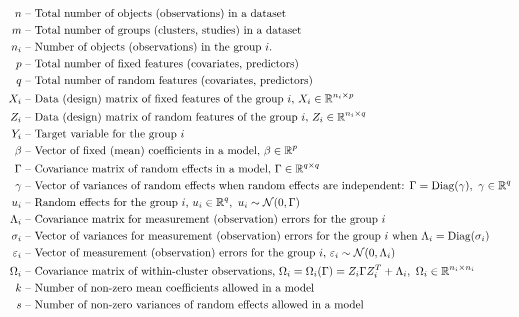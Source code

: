 \documentclass[11pt,letterpaper]{article}
\numberwithin{equation}{section} %
\numberwithin{figure}{section} %
\numberwithin{table}{section} %
\begin{document}
\begin{center}
	\begin{equation}
		\begin{split}
			n & \text{ -- Total number of objects (observations) in a dataset} \\
			m & \text{ -- Total number of groups (clusters, studies) in a dataset} \\
			n_i & \text{ -- Number of objects (observations) in the group } i. \\
			p & \text{ -- Total number of fixed features (covariates, predictors)} \\
			q & \text{ -- Total number of random features (covariates, predictors)} \\
			X_i & \text{ -- Data (design) matrix of fixed features of the group $i$, } X_i \in \R^{n_i \times p} \\
			Z_i & \text{ -- Data (design) matrix of random features of the group $i$, } Z_i \in \R^{n_i \times q} \\
			Y_i & \text{ -- Target variable for the group } i \\
			\beta & \text{ -- Vector of fixed (mean) coefficients in a model, } \beta \in \R^{p} \\
			\Gamma & \text{ -- Covariance matrix of random effects in a model, } \Gamma \in \R^{q\times q} \\
			\gamma & \text{ -- Vector of variances of random effects when random effects are independent: } \Gamma = \diag(\gamma), \ \gamma \in \R^{q} \\
			u_i & \text{ -- Random effects for the group $i$, } u_i \in \R^q, \ u_i \sim \NN(0, \Gamma) \\
			\Lambda_i & \text{ -- Covariance matrix for measurement (observation) errors for the group $i$} \\
			\sigma_i & \text{ -- Vector of variances for measurement (observation) errors for the group $i$ when } \Lambda_i = \diag(\sigma_i) \\
			\varepsilon_i & \text{ -- Vector of measurement (observation) errors for the group $i$, } \varepsilon_i \sim \NN(0, \Lambda_i) \\
			\Omega_i & \text{ -- Covariance matrix of within-cluster observations, } \Omega_i = \Omega_i(\Gamma) = Z_i\Gamma Z_i^T + \Lambda_i, \ \Omega_i \in \R^{n_i \times n_i} \\
			k & \text{ -- Number of non-zero mean coefficients allowed in a model} \\
			s & \text{ -- Number of non-zero variances of random effects allowed in a model} \\

\end{split}
\end{equation}
\end{center}
\end{document}
